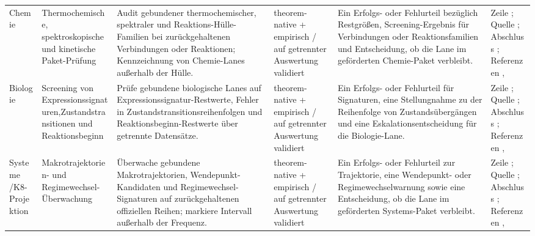 \begin{longtable}{@{}L{0.11\textwidth}L{0.16\textwidth}L{0.19\textwidth}L{0.12\textwidth}L{0.18\textwidth}L{0.16\textwidth}@{}}
Chemie & Thermochemische, spektroskopische und kinetische Paket-Prüfung & Audit gebundener thermochemischer, spektraler und Reaktions-Hülle-Familien bei zurückgehaltenen Verbindungen oder Reaktionen; Kennzeichnung von Chemie-Lanes außerhalb der Hülle. & theorem-native + empirisch / auf getrennter Auswertung validiert & Ein Erfolgs- oder Fehlurteil bezüglich Restgrößen, Screening-Ergebnis für Verbindungen oder Reaktionsfamilien und Entscheidung, ob die Lane im geförderten Chemie-Paket verbleibt. & Zeile ; \allowbreak Quelle ; \allowbreak Abschluss ; \allowbreak Referenzen , \allowbreak {} \\
Biologie & Screening von Expressionssignaturen,\allowbreak Zustandstransitionen und Reaktionsbeginn & Prüfe gebundene biologische Lanes auf Expressionssignatur-Restwerte, Fehler in Zustandstransitionsreihenfolgen und Reaktionsbeginn-Restwerte über getrennte Datensätze. & theorem-native + empirisch / auf getrennter Auswertung validiert & Ein Erfolgs- oder Fehlurteil für Signaturen, eine Stellungnahme zu der Reihenfolge von Zustandsübergängen und eine Eskalationsentscheidung für die Biologie-Lane. & Zeile ; \allowbreak Quelle ; \allowbreak Abschluss ; \allowbreak Referenzen , \allowbreak {} \\
Systeme /\allowbreak K8-Projektion & Makrotrajektorien- und Regimewechsel-Überwachung & Überwache gebundene Makrotrajektorien, Wendepunkt-Kandidaten und Regimewechsel-Signaturen auf zurückgehaltenen offiziellen Reihen; markiere Intervall außerhalb der Frequenz. & theorem-native + empirisch / auf getrennter Auswertung validiert & Ein Erfolgs- oder Fehlurteil zur Trajektorie, eine Wendepunkt- oder Regimewechselwarnung sowie eine Entscheidung, ob die Lane im geförderten Systems-Paket verbleibt. & Zeile ; \allowbreak Quelle ; \allowbreak Abschluss ; \allowbreak Referenzen , \allowbreak {} \\

\end{longtable}
